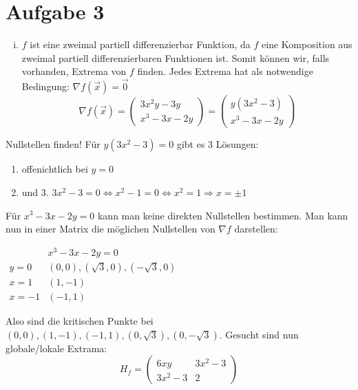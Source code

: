 \documentclass[10pt,a4paper,parskip=half]{scrartcl}
\begin{document}
\section*{Aufgabe 3}
\begin{enumerate}[(i)]
	\item 	\(f\) ist eine zweimal partiell differenzierbar Funktion, da \(f\) eine Komposition aus zweimal partiell differenzierbaren Funktionen ist. Somit können wir, falls vorhanden, Extrema von $f$ finden. Jedes Extrema hat als notwendige Bedingung: $\nabla f(\vec x) = \vec 0$
	\[ \nabla f (\vec x) = 
	\begin{pmatrix}
		3x^2y - 3y \\
		x^3 - 3x - 2y 
	\end{pmatrix} =  
	\begin{pmatrix}
		y(3x^2 - 3) \\
		x^3 - 3x - 2y 
	\end{pmatrix}  \]
\end{enumerate}
Nullstellen finden!
Für \( y(3x^2 -3) = 0 \) gibt es 3 Lösungen:
\begin{enumerate}
	\item offenichtlich bei $y = 0$
	\item  und 3. \(3x^2 - 3 = 0 \Leftrightarrow x^2 - 1 = 0 \Leftrightarrow x^2 = 1 \Rightarrow x = \pm 1\)
\end{enumerate}
Für \( x^3 - 3x - 2y  = 0 \) kann man keine direkten Nullstellen bestimmen.
Man kann nun in einer Matrix die möglichen Nullstellen von $\nabla f$ darstellen: \\
\begin{center}
\begin{math}
	\begin{array}{c|cc}
	 & x^3 - 3x - 2y  = 0  \\
	 \hline
	 y = 0 & (0,0),(\sqrt{3},0),(-\sqrt{3},0)\\
	 x = 1 & (1,-1)\\
	 x = -1 & (-1,1)
	\end{array}
\end{math}
\end{center}
Also sind die kritischen Punkte bei $(0,0), (1,-1),(-1,1),(0,\sqrt{3}),(0,-\sqrt{3})$. Gesucht sind nun globale/lokale Extrama:
	\[H_f = 
	\begin{pmatrix}
		6xy & 3x^2 - 3 \\
		3x^2 - 3 & 2	
	\end{pmatrix} \]
\end{document}
